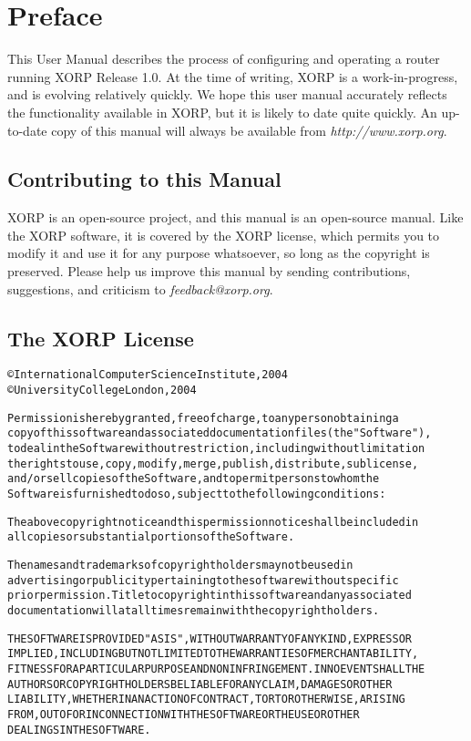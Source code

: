 \chapter*{Preface}

\vspace{-0.1in}
This User Manual describes the process of configuring and operating a
router running XORP Release 1.0.  At the time of writing, XORP is a
work-in-progress, and is evolving relatively quickly.  We hope this
user manual accurately reflects the functionality available in XORP,
but it is likely to date quite quickly.  An up-to-date copy of this
manual will always be available from {\it http://www.xorp.org}.

\section*{Contributing to this Manual}
\vspace{-0.1in}
XORP is an open-source project, and this manual is an open-source
manual.  Like the XORP software, it is covered by the XORP license,
which permits you to modify it and use it for any purpose whatsoever,
so long as the copyright is preserved.  Please help us improve this
manual by sending contributions, suggestions, and criticism to {\it
  feedback@xorp.org}.

\section*{The XORP License}
\vspace{-0.3in}
\begin{alltt}
\small\noindent
\copyright International Computer Science Institute, 2004
\copyright University College London, 2004

Permission is hereby granted, free of charge, to any person obtaining a
copy of this software and associated documentation files (the "Software"),
to deal in the Software without restriction, including without limitation
the rights to use, copy, modify, merge, publish, distribute, sublicense,
and/or sell copies of the Software, and to permit persons to whom the
Software is furnished to do so, subject to the following conditions:

The above copyright notice and this permission notice shall be included in
all copies or substantial portions of the Software.

The names and trademarks of copyright holders may not be used in
advertising or publicity pertaining to the software without specific
prior permission. Title to copyright in this software and any associated
documentation will at all times remain with the copyright holders.

THE SOFTWARE IS PROVIDED "AS IS", WITHOUT WARRANTY OF ANY KIND, EXPRESS OR
IMPLIED, INCLUDING BUT NOT LIMITED TO THE WARRANTIES OF MERCHANTABILITY,
FITNESS FOR A PARTICULAR PURPOSE AND NONINFRINGEMENT. IN NO EVENT SHALL THE
AUTHORS OR COPYRIGHT HOLDERS BE LIABLE FOR ANY CLAIM, DAMAGES OR OTHER
LIABILITY, WHETHER IN AN ACTION OF CONTRACT, TORT OR OTHERWISE, ARISING
FROM, OUT OF OR IN CONNECTION WITH THE SOFTWARE OR THE USE OR OTHER
DEALINGS IN THE SOFTWARE.
\end{alltt}